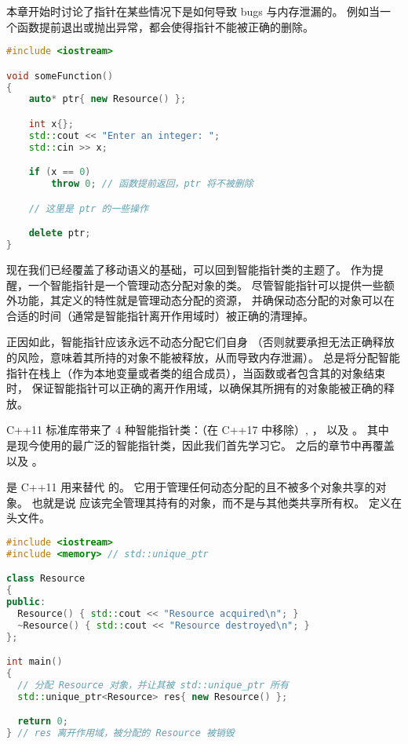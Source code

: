 \documentclass[../../LearnCpp.tex]{subfiles}
\begin{document}

本章开始时讨论了指针在某些情况下是如何导致 bugs 与内存泄漏的。
例如当一个函数提前退出或抛出异常，都会使得指针不能被正确的删除。

\begin{lstlisting}[language=C++]
#include <iostream>

void someFunction()
{
    auto* ptr{ new Resource() };

    int x{};
    std::cout << "Enter an integer: ";
    std::cin >> x;

    if (x == 0)
        throw 0; // 函数提前返回，ptr 将不被删除

    // 这里是 ptr 的一些操作

    delete ptr;
}
\end{lstlisting}

现在我们已经覆盖了移动语义的基础，可以回到智能指针类的主题了。
作为提醒，一个智能指针是一个管理动态分配对象的类。
尽管智能指针可以提供一些额外功能，其定义的特性就是管理动态分配的资源，
并确保动态分配的对象可以在合适的时间（通常是智能指针离开作用域时）被正确的清理掉。

正因如此，智能指针应该永远不动态分配它们自身
（否则就要承担无法正确释放的风险，意味着其所持的对象不能被释放，从而导致内存泄漏）。
总是将分配智能指针在栈上（作为本地变量或者类的组合成员），当函数或者包含其的对象结束时，
保证智能指针可以正确的离开作用域，以确保其所拥有的对象能被正确的释放。

C++11 标准库带来了 4 种智能指针类：（在 C++17 中移除）,
，  以及 。
其中  是现今使用的最广泛的智能指针类，因此我们首先学习它。
之后的章节中再覆盖  以及 。

 是 C++11 用来替代  的。
它用于管理任何动态分配的且不被多个对象共享的对象。
也就是说  应该完全管理其持有的对象，而不是与其他类共享所有权。
 定义在  头文件。

\begin{lstlisting}[language=C++]
#include <iostream>
#include <memory> // std::unique_ptr

class Resource
{
public:
  Resource() { std::cout << "Resource acquired\n"; }
  ~Resource() { std::cout << "Resource destroyed\n"; }
};

int main()
{
  // 分配 Resource 对象，并让其被 std::unique_ptr 所有
  std::unique_ptr<Resource> res{ new Resource() };

  return 0;
} // res 离开作用域，被分配的 Resource 被销毁
\end{lstlisting}
\end{document}
